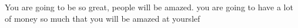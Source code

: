 You are going to be so great, people will be amazed.
you are going to have a lot of money so much that you will be amazed at yourslef